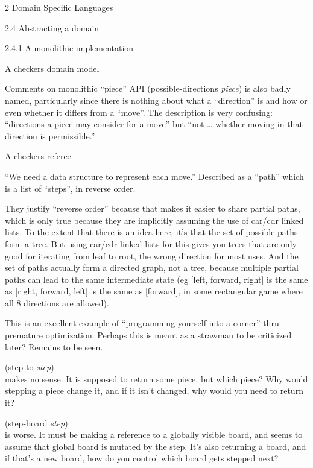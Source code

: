 \documentclass[12pt]{PalisadesLakesBook}
\begin{document}
\begin{plSection}{2 Domain Specific Languages}
\begin{plSection}{2.4 Abstracting a domain}
\begin{plSection}{2.4.1 A monolithic implementation}
\begin{plSection}{A checkers domain model}
\begin{plSection}{Comments on monolithic ``piece'' API}
{\schemeFont (possible-directions {\itshape piece})}
is also badly named, particularly since there is nothing
about what a ``direction'' is and how or even whether it differs
from a ``move''.
The description is very confusing:
``directions a piece may consider for a move''
but 
``not {\ldots} whether moving in that direction is permissible.''

\end{plSection}%
\end{plSection}%
\begin{plSection}{A checkers referee}

``We need a data structure to represent each move.''
Described as a ``path'' which is a list of ``steps'',
in reverse order.

They justify ``reverse order'' because that makes it easier
to share partial paths, which is only true because they are 
implicitly assuming the use of {\schemeFont car/cdr} linked lists.
To the extent that there is an idea here, it's that the set of
possible paths form a tree. 
But using {\schemeFont car/cdr} linked lists for this gives you
trees that are only good for iterating from leaf to root,
the wrong direction for most uses.
And the set of paths actually form a directed graph, not a tree,
because multiple partial paths can lead to the same intermediate
state (eg [left, forward, right] is the same as 
[right, forward, left] is the same as [forward],
in some rectangular game where all 8 directions are allowed).
 
This is an excellent example of 
``programming yourself into a corner'' 
thru premature optimization.
Perhaps this is meant as a strawman to be criticized later?
Remains to be seen.

{\schemeFont (step-to {\itshape step})}\\
makes no sense.
It is supposed to return some piece, but which piece?
Why would stepping a piece change it, and if it isn't changed,
why would you need to return it?

{\schemeFont (step-board {\itshape{step}})}\\
is worse.
It must be making a reference to a globally visible 
{\schemeFont board}, and seems to assume that global board
is mutated by the step.
It's also returning a board, and if that's a new board,
how do you control which board gets stepped next?


\end{plSection}
\end{plSection}
\end{plSection}
\end{plSection}
\end{document}
